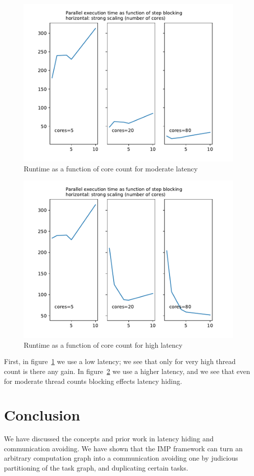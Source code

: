\documentclass[11pt,fleqn,preprint]{impreport}
\begin{document}
\begin{figure}[ht]
  \includegraphics[scale=.4]{strongscale-1000}
  \caption{Runtime as a function of core count for moderate latency}
  \label{fig:lat1000}
\end{figure}
\begin{figure}[ht]
  \includegraphics[scale=.4]{strongscale-10000}
  \caption{Runtime as a function of core count for high latency}
  \label{fig:lat10000}
\end{figure}
First, in figure~\ref{fig:lat1000} we use a low latency; we see that
only for very high thread count is there any gain. In
figure~\ref{fig:lat10000} we use a higher latency, and we see that
even for moderate thread counts blocking effects latency hiding.


\section{Conclusion}

We have discussed the concepts and prior work in latency hiding and
communication avoiding. We have shown that the IMP framework can turn
an arbitrary computation graph into a communication avoiding one by
judicious partitioning of the task graph, and duplicating certain tasks.



\end{document}
